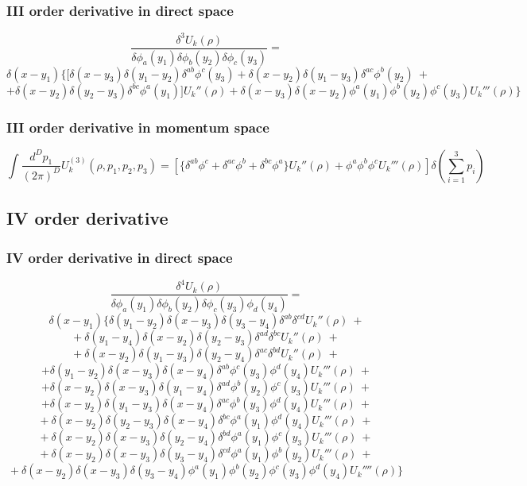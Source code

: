 \subsubsection{III order derivative in direct space}
\begin{equation}
\frac{\delta^3 U_k(\rho)}{\delta \phi_a(y_1)\delta \phi_b(y_2)\delta \phi_c(y_3)} = 
\end{equation}
$$\delta(x - y_1)\Big\{\big[ \delta(x - y_3) \delta(y_1 - y_2)\delta^{ab}\phi^c(y_3) + \delta(x - y_2)\delta(y_1 - y_3)\delta^{ac}\phi^b(y_2)\ +$$
$$+ \delta(x - y_2)\delta(y_2 - y_3)\delta^{bc}\phi^a(y_1)\big]U_k''(\rho) + \delta(x - y_3)\delta(x-y_2)\phi^a(y_1)\phi^b(y_2)\phi^c(y_3)U_k'''(\rho)\Big\} $$
\subsubsection{III order derivative in momentum space}
\begin{equation}\label{U3}
\int  \frac{d^Dp_1}{(2\pi)^D} U_k^{(3)}(\rho, p_1, p_2, p_3) = \left[\big\{\delta^{ab}\phi^c + \delta^{ac}\phi^b + \delta^{bc}\phi^a\big\}U_k''(\rho) + \phi^a\phi^b\phi^cU_k'''(\rho)\right]\delta\left(\sum_{i=1}^3 p_i\right)
\end{equation}

\subsection{IV order derivative}
\subsubsection{IV order derivative in direct space}
\begin{equation}
\frac{\delta^4 U_k(\rho)}{\delta \phi_a(y_1)\delta \phi_b(y_2)\delta \phi_c(y_3) \phi_d(y_4)} = 
\end{equation}
$$ \delta(x - y_1) \Big\{ \delta(y_1 - y_2) \delta(x - y_3) \delta(y_3 - y_4)\delta^{ab}\delta^{cd}U_k''(\rho) \ + $$
$$+\ \delta(y_1 - y_4) \delta(x - y_2) \delta(y_2 - y_3)\delta^{ad}\delta^{bc}U_k''(\rho) \ + $$
$$+\ \delta(x - y_2)\delta(y_1 - y_3)\delta(y_2 - y_4)\delta^{ac}\delta^{bd}U_k''(\rho) \ + $$
$$+ \delta(y_1 - y_2) \delta(x - y_3) \delta(x - y_4)\delta^{ab} \phi^c(y_3)\phi^d(y_4)U_k'''(\rho) \ +$$
$$+ \delta(x - y_2) \delta(x - y_3) \delta(y_1 - y_4)\delta^{ad}\phi^b(y_2)\phi^c(y_3)U_k'''(\rho) \ + $$
$$+ \delta(x - y_2) \delta(y_1 - y_3) \delta(x - y_4)\delta^{ac}\phi^b(y_3)\phi^d(y_4)U_k'''(\rho) \ + $$
$$+\ \delta(x - y_2)\delta(y_2 - y_3)\delta(x - y_4)\delta^{bc}\phi^a(y_1)\phi^d(y_4)U_k'''(\rho) \ + $$
$$+\ \delta(x - y_2)\delta(x - y_3)\delta(y_2 - y_4)\delta^{bd}\phi^a(y_1)\phi^c(y_3)U_k'''(\rho) \ + $$
$$+\ \delta(x - y_2)\delta(x - y_3)\delta(y_3 - y_4)\delta^{cd}\phi^a(y_1)\phi^b(y_2)U_k'''(\rho) \ + $$
$$+\ \delta(x - y_2)\delta(x - y_3)\delta(y_3 - y_4)\phi^a(y_1)\phi^b(y_2)\phi^c(y_3)\phi^d(y_4)U_k''''(\rho)\Big\} $$

